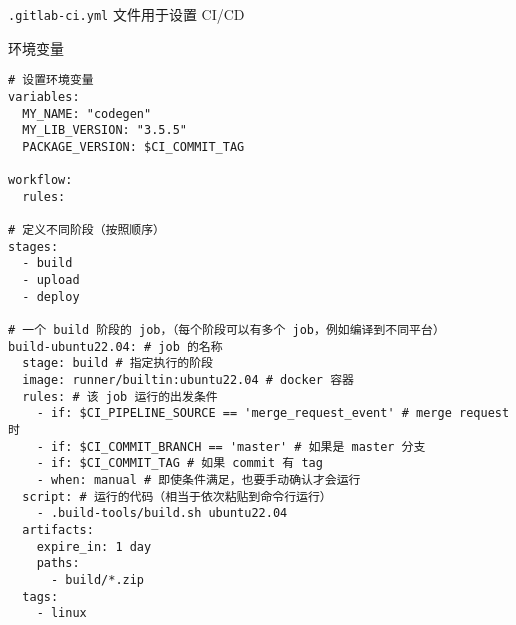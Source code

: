 
\verb`.gitlab-ci.yml` 文件用于设置 CI/CD

环境变量
\begin{lstlisting}[language=none]
# 设置环境变量
variables:
  MY_NAME: "codegen"
  MY_LIB_VERSION: "3.5.5"
  PACKAGE_VERSION: $CI_COMMIT_TAG

workflow:
  rules:

# 定义不同阶段（按照顺序）
stages:
  - build
  - upload
  - deploy

# 一个 build 阶段的 job，（每个阶段可以有多个 job，例如编译到不同平台）
build-ubuntu22.04: # job 的名称
  stage: build # 指定执行的阶段
  image: runner/builtin:ubuntu22.04 # docker 容器
  rules: # 该 job 运行的出发条件
    - if: $CI_PIPELINE_SOURCE == 'merge_request_event' # merge request 时
    - if: $CI_COMMIT_BRANCH == 'master' # 如果是 master 分支
    - if: $CI_COMMIT_TAG # 如果 commit 有 tag
    - when: manual # 即使条件满足，也要手动确认才会运行
  script: # 运行的代码（相当于依次粘贴到命令行运行）
    - .build-tools/build.sh ubuntu22.04
  artifacts:
    expire_in: 1 day
    paths:
      - build/*.zip
  tags:
    - linux
\end{lstlisting}
